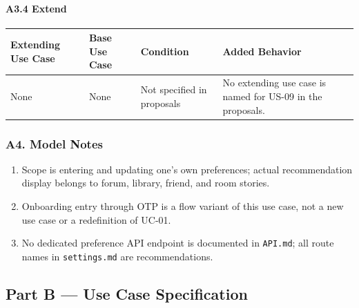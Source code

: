 \documentclass[12pt]{article}
\renewcommand{\baselinestretch}{1.5}
\begin{document}
\hypertarget{sec:a3-4-extend}{}
\paragraph*{A3.4 Extend}
\par\medskip

\begingroup
\small
\renewcommand{\baselinestretch}{1.0}\selectfont
\renewcommand{\arraystretch}{1.15}
\setlength{\tabcolsep}{6pt}
\begin{longtable}{|>{\raggedright\arraybackslash}p{}|>{\raggedright\arraybackslash}p{}|>{\raggedright\arraybackslash}p{}|>{\raggedright\arraybackslash}p{}|}
\hline
\textbf{Extending Use Case} & \textbf{Base Use Case} & \textbf{Condition} & \textbf{Added Behavior} \\ \hline
\endhead
None & None & Not specified in proposals & No extending use case is named for US-09 in the proposals. \\ \hline
\end{longtable}
\endgroup
\par\medskip

\hypertarget{sec:a4-model-notes}{}
\subsubsection*{A4. Model Notes}
\par\medskip

\begin{enumerate}
\item Scope is entering and updating one's own preferences; actual recommendation display belongs to forum, library, friend, and room stories.
\item Onboarding entry through OTP is a flow variant of this use case, not a new use case or a redefinition of UC-01.
\item No dedicated preference API endpoint is documented in \texttt{API.md}; all route names in \texttt{settings.md} are recommendations.
\end{enumerate}
\par\medskip

\hypertarget{sec:part-b-use-case-specification}{}
\subsection*{Part B --- Use Case Specification}
\par\medskip
\end{document}
